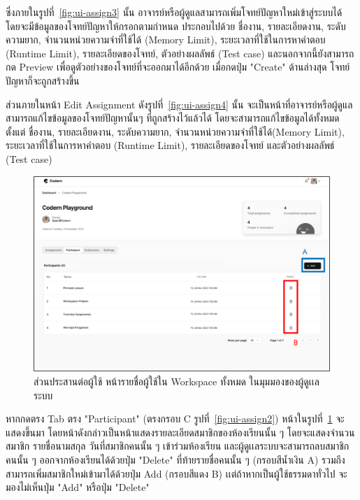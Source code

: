 \documentclass[12pt,one side,openright,a4paper]{cpe-thesis-th}
\newcommand{\thaijustify}[1]{%
  \par\hspace{30pt}\justifying
  #1
}
\begin{document}
\thaijustify{
  ซึ่งภายในรูปที่~\ref{fig:ui-assign3} นั้น อาจารย์หรือผู้ดูแลสามารถเพิ่มโจทย์ปัญหาใหม่เข้าสู่ระบบได้ โดยจะมีข้อมูลของโจทย์ปัญหาให้กรอกตามกำหนด ประกอบไปด้วย ชื่องาน, รายละเอียดงาน, ระดับความยาก, จำนวนหน่วยความจำที่ใช้ได้ (Memory Limit), ระยะเวลาที่ใช้ในการหาคำตอบ (Runtime Limit), รายละเอียดของโจทย์, ตัวอย่างผลลัพธ์ (Test case) และนอกจากนี้ยังสามารถกด Preview เพื่อดูตัวอย่างของโจทย์ที่จะออกมาได้อีกด้วย เมื่อกดปุ่ม "Create" ด้านล่างสุด โจทย์ปัญหาก็จะถูกสร้างขึ้น
}
\thaijustify{
  ส่วนภายในหน้า Edit Assignment ดังรูปที่~\ref{fig:ui-assign4} นั้น จะเป็นหน้าที่อาจารย์หรือผู้ดูแลสามารถแก้ไขข้อมูลของโจทย์ปัญหานั้นๆ ที่ถูกสร้างไว้แล้วได้ โดยจะสามารถแก้ไขข้อมูลได้ทั้งหมด ตั้งแต่ ชื่องาน, รายละเอียดงาน, ระดับความยาก, จำนวนหน่วยความจำที่ใช้ได้(Memory Limit), ระยะเวลาที่ใช้ในการหาคำตอบ (Runtime Limit), รายละเอียดของโจทย์ และตัวอย่างผลลัพธ์ (Test case)
}
\pagebreak
\hypertarget{ui-assign6}{
  \begin{figure}[H]
    \centering
    \includegraphics[width=15cm]{figure/ui/ui-assign6.png}
    \caption[ส่วนประสานต่อผู้ใช้ หน้ารายชื่อผู้ใช้ใน Workspace ทั้งหมดในมุมมองของผู้ดูเเลระบบ]{ส่วนประสานต่อผู้ใช้ หน้ารายชื่อผู้ใช้ใน Workspace ทั้งหมด ในมุมมองของผู้ดูเเลระบบ}
    \label{fig:ui-assign6}
  \end{figure}
}
\thaijustify{
  หากกดตรง Tab ตรง "Participant" (ตรงกรอบ C รูปที่~\ref{fig:ui-assign2}) หน้าในรูปที่~\ref{fig:ui-assign6} จะแสดงขึ้นมา โดยหน้าดังกล่าวเป็นหน้าแสดงรายละเอียดสมาชิกของห้องเรียนนั้น ๆ โดยจะแสดงจำนวนสมาชิก รายชื่อนามสกุล วันที่สมาชิกคนนั้น ๆ เข้าร่วมห้องเรียน และผู้ดูเเลระบบจะสามารถลบสมาชิกคนนั้น ๆ ออกจากห้องเรียนได้ด้วยปุ่ม "Delete" ที่ท้ายรายชื่อคนนั้น ๆ (กรอบสีน้ำเงิน A) รวมถึงสามารถเพิ่มสมาชิกใหม่เข้ามาได้ด้วยปุ่ม Add (กรอบสีแดง B) เเต่ถ้าหากเป็นผู้ใช้ธรรมดาทั่วไป จะมองไม่เห็นปุ่ม "Add" หรือปุ่ม "Delete"
}
\end{document}

